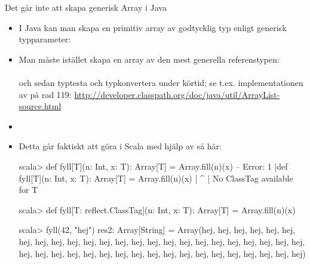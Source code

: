\begin{Slide}{Det går inte att skapa generisk Array i Java}\SlideFontTiny
\begin{itemize}
\item I Java kan man  skapa en primitiv array av godtycklig typ enligt generisk typparameter: \sout{}

\item Man måste istället skapa en array av den mest generella referenstypen: \\
 \\
och sedan typtesta och typkonvertera under körtid; se t.ex. implementationen av  på rad 119: \href{http://developer.classpath.org/doc/java/util/ArrayList-source.html}{http://developer.classpath.org/doc/java/util/ArrayList-source.html}

\item[]
\pause
\item Detta går faktiskt att göra i Scala med hjälp av  \pause så här: \\
\begin{REPLsmall}
scala> def fyll[T](n: Int, x: T): Array[T] = Array.fill(n)(x)
-- Error:
1 |def fyll[T](n: Int, x: T): Array[T] = Array.fill(n)(x)
  |                                                      ^
  |  No ClassTag available for T

scala> def fyll[T: reflect.ClassTag](n: Int, x: T): Array[T] = Array.fill(n)(x)

scala> fyll(42, "hej")
res2: Array[String] = Array(hej, hej, hej, hej, hej, hej, hej, hej, hej, hej, hej, hej, hej, hej, hej, hej, hej, hej, hej, hej, hej, hej, hej, hej, hej, hej, hej, hej, hej, hej, hej, hej, hej, hej, hej, hej, hej, hej, hej, hej, hej, hej)

\end{REPLsmall}


\end{itemize}


\end{Slide}

